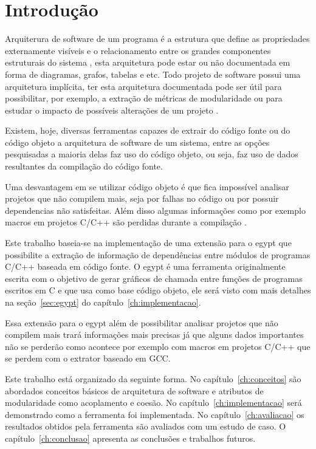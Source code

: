 \chapter{Introdução}

Arquiterura de software de um programa é a estrutura que define as propriedades
externamente visíveis e o relacionamento entre os grandes componentes
estruturais do sistema \cite{engenhariaDeSoftwarePressman}, esta arquitetura
pode estar ou não documentada em forma de diagramas, grafos, tabelas e etc.
Todo projeto de software possui uma arquitetura implícita, ter esta arquitetura
documentada pode ser útil para possibilitar, por exemplo, a extração de
métricas de modularidade ou para estudar o impacto de possíveis alterações de
um projeto \cite{mata26-terceiro-projeto-piloto}.

Existem, hoje, diversas ferramentas capazes de extrair do código fonte ou do
código objeto a arquitetura de software de um sistema, entre as opções
pesquisadas \cite{sourceVersusObjectCodeExtraction} a maioria delas faz uso do
código objeto, ou seja, faz uso de dados resultantes da compilação do código
fonte.

Uma desvantagem em se utilizar código objeto é que fica impossível
analisar projetos que não compilem mais, seja por falhas no código ou por
possuir dependencias não satisfeitas. Além disso algumas informações como por
exemplo macros em projetos C/C++ são perdidas durante a
compilação \cite{sourceVersusObjectCodeExtraction}.

Este trabalho baseia-se na implementação de uma extensão para o egypt que
possibilite a extração de informação de dependências entre módulos de programas
C/C++ baseada em código fonte. O egypt é uma ferramenta originalmente escrita
com o objetivo de gerar gráficos de chamada entre funções de programas escritos
em C e que usa como base código objeto, ele será visto com mais detalhes na
seção~\ref{sec:egypt} do capítulo~\ref{ch:implementacao}.

Essa extensão para o egypt além de possibilitar analisar projetos que não
compilem mais trará informações mais precisas já que alguns dados importantes
não se perderão como acontece por exemplo com macros em projetos C/C++
\cite{sourceVersusObjectCodeExtraction} que se perdem com o extrator baseado em
GCC.

Este trabalho está organizado da seguinte forma. No capítulo~\ref{ch:conceitos}
são abordados conceitos básicos de arquitetura de software e atributos de
modularidade como acoplamento e coesão. No capítulo~\ref{ch:implementacao} será
demonstrado como a ferramenta foi implementada. No capítulo~\ref{ch:avaliacao}
os resultados obtidos pela ferramenta são avaliados com um estudo de caso. O
capítulo~\ref{ch:conclusao} apresenta as conclusões e trabalhos futuros.

